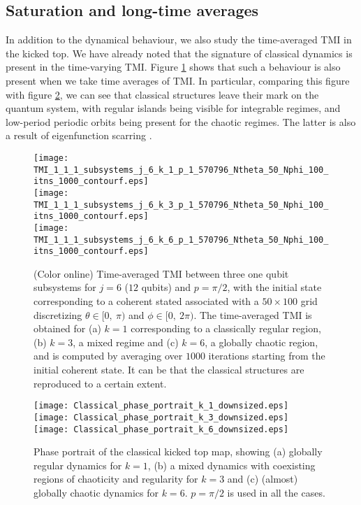 \documentclass[pre,aps,showpacs,showkeys,twocolumn]{revtex4-1}
\theoremstyle{definition}
\theoremstyle{remark}
\begin{document}
\subsection{Saturation and long-time averages}
In addition to the dynamical behaviour, we also study the time-averaged TMI in the kicked top. We have already noted that the signature of classical dynamics is present in the time-varying TMI. Figure \ref{fig:timeaveraged_tmi} shows that such a behaviour is also present when we take time averages of TMI. In particular, comparing this figure with figure \ref{fig:classicalphaseportrait}, we can see that classical structures leave their mark on the quantum system, with regular islands being visible for integrable regimes, and low-period periodic orbits being present for the chaotic regimes. The latter is also a result of eigenfunction scarring \cite{heller1984bound}.

\begin{figure}[!htpb]
    \texttt{[image: TMI\_1\_1\_1\_subsystems\_j\_6\_k\_1\_p\_1\_570796\_Ntheta\_50\_Nphi\_100\_itns\_1000\_contourf.eps]}
    \\
    \texttt{[image: TMI\_1\_1\_1\_subsystems\_j\_6\_k\_3\_p\_1\_570796\_Ntheta\_50\_Nphi\_100\_itns\_1000\_contourf.eps]}
    \\
    \texttt{[image: TMI\_1\_1\_1\_subsystems\_j\_6\_k\_6\_p\_1\_570796\_Ntheta\_50\_Nphi\_100\_itns\_1000\_contourf.eps]}

    \caption{(Color online) Time-averaged TMI between three one qubit subsystems for $j = 6$ ($12$ qubits) and $p = \pi/2$, with the initial state corresponding to a coherent stated associated with a $50 \times 100$ grid discretizing $\theta \in [0,\ \pi)$ and $\phi \in [0,\ 2\pi)$. The time-averaged TMI is obtained for (a) $k = 1$ corresponding to a classically regular region, (b) $k = 3$, a mixed regime and (c) $k = 6$, a globally chaotic region, and is computed by averaging over $1000$ iterations starting from the initial coherent state. It can be that the classical structures are reproduced to a certain extent.}
    \label{fig:timeaveraged_tmi}
\end{figure}

\begin{figure}[!htpb]
    \texttt{[image: Classical\_phase\_portrait\_k\_1\_downsized.eps]}
    \\
    \texttt{[image: Classical\_phase\_portrait\_k\_3\_downsized.eps]}
    \\
    \texttt{[image: Classical\_phase\_portrait\_k\_6\_downsized.eps]}

    \caption{Phase portrait of the classical kicked top map, showing (a) globally regular dynamics for $k = 1$, (b) a mixed dynamics with coexisting regions of chaoticity and regularity for $k = 3$ and (c) (almost) globally chaotic dynamics for $k = 6$. $p = \pi/2$ is used in all the cases.}
    \label{fig:classicalphaseportrait}
\end{figure}
\end{document}
